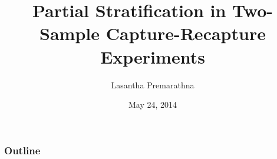 \documentclass{beamer}
\begin{document}
\title[SSC 2014]{Partial Stratification in Two-Sample Capture-Recapture Experiments}  
\author[Lasantha Premarathna]{Lasantha Premarathna}
\date{May 24, 2014} %

\begin{frame}
\titlepage
\end{frame}
\begin{frame}\frametitle{Outline}\tableofcontents
\end{frame} 

\end{document}

